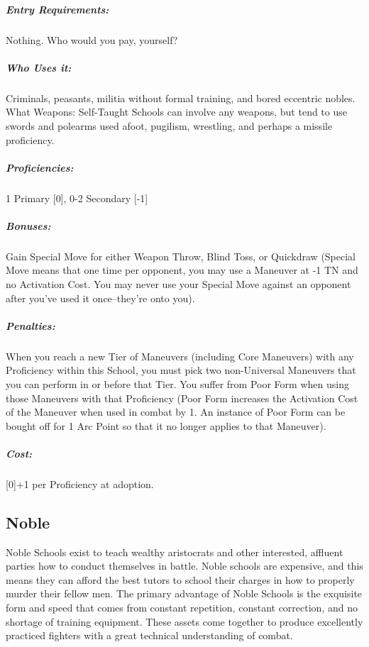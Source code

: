 \documentclass[oneside,11pt,english]{book}
\begin{document}
\vspace{-15pt}\subparagraph{Entry Requirements:} Nothing. Who would you pay, yourself?
\vspace{-15pt}\subparagraph{Who Uses it:} Criminals, peasants, militia without formal training, and bored eccentric nobles. What Weapons: Self-Taught Schools can involve any weapons, but tend to use swords and polearms used afoot, pugilism, wrestling, and perhaps a missile proficiency.
\vspace{-15pt}\subparagraph{Proficiencies:} 1 Primary [0], 0-2 Secondary [-1]
\vspace{-15pt}\subparagraph{Bonuses:} Gain Special Move for either Weapon Throw, Blind Toss, or Quickdraw (Special Move means that one time per opponent, you may use a Maneuver at -1 TN and no Activation Cost. You may never use your Special Move against an opponent after you’ve used it once--they’re onto you). 
\vspace{-15pt}\subparagraph{Penalties:} When you reach a new Tier of Maneuvers (including Core Maneuvers) with any Proficiency within this School, you must pick two non-Universal Maneuvers that you can perform in or before that Tier. You suffer from Poor Form when using those Maneuvers with that Proficiency (Poor Form increases the Activation Cost of the Maneuver when used in combat by 1. An instance of Poor Form can be bought off for 1 Arc Point so that it no longer applies to that Maneuver).
\vspace{-15pt}\subparagraph{Cost:} [0]+1 per Proficiency at adoption.

\subsection{Noble}
Noble Schools exist to teach wealthy aristocrats and other interested, affluent parties how to conduct 
themselves in battle. Noble schools are expensive, and this means they can afford the best tutors to school 
their charges in how to properly murder their fellow men. The primary advantage of Noble Schools is the 
exquisite form and speed that comes from constant repetition, constant correction, and no shortage of 
training equipment. These assets come together to produce excellently practiced fighters with a great 
technical understanding of combat. 
\end{document}

